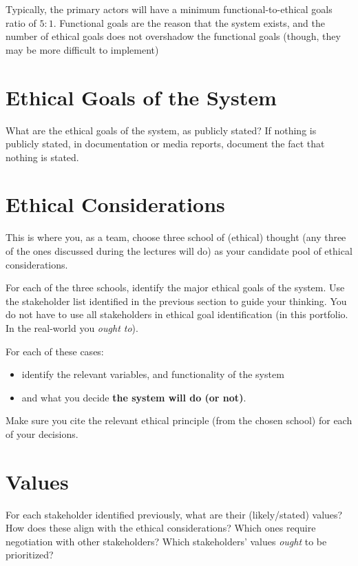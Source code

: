 \documentclass[]
{UCD_CS_41820_Report}
\begin{document}
Typically, the primary actors will have a minimum functional-to-ethical goals ratio of $5:1$. Functional goals are the reason that the system exists, and the number of ethical goals does not overshadow the functional goals (though, they may be more difficult to implement)

\section{Ethical Goals of the System}
What are the ethical goals of the system, as publicly stated? If nothing is publicly stated, in documentation or media reports, document the fact that nothing is stated.

\section{Ethical Considerations}
This is where you, as a team, choose three school of (ethical) thought (any three of the ones discussed during the lectures will do) as your candidate pool of ethical considerations.

For each of the three schools, identify the major ethical goals of the system. Use the stakeholder list identified in the previous section to guide your thinking. You do not have to use all stakeholders in ethical goal identification (in this portfolio. In the real-world you \textit{ought to}).

For each of these cases:
\begin{itemize}
    \item identify the relevant variables, and functionality of the system
    \item and what you decide \textbf{the system will do (or not)}.
\end{itemize}

Make sure you cite the relevant ethical principle (from the chosen school) for each of your decisions.

\section{Values}
For each stakeholder identified previously, what are their (likely/stated) values? How does these align with the ethical considerations? Which ones require negotiation with other stakeholders? Which stakeholders' values \textit{ought} to be prioritized?

\end{document}
